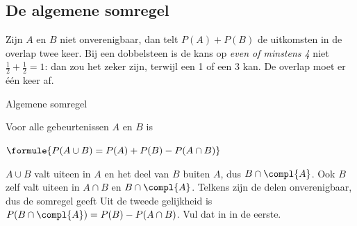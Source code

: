 \begin{oefeningen}
\end{oefeningen}

\subsection{De algemene somregel}

Zijn $A$ en $B$ niet onverenigbaar, dan telt $P(A) + P(B)$ de uitkomsten in de overlap twee keer. Bij een dobbelsteen is de kans op \textit{even of minstens 4} niet $\frac12 + \frac12 = 1$: dan zou het zeker zijn, terwijl een 1 of een 3 kan. De overlap moet er één keer af.

\begin{theorie}
\begin{stelling}{Algemene somregel}
\begin{minipage}[t]{.64\linewidth}
\vspace{0pt}
Voor alle gebeurtenissen $A$ en $B$ is

\vspace{1mm}
\qquad $\formule{P(A \cup B) = P(A) + P(B) - P(A \cap B)}$
\end{minipage}\hfill
\begin{minipage}[t]{.3\linewidth}
\vspace{0pt}
\end{minipage}
\end{stelling}

\begin{bewijs}
$A \cup B$ valt uiteen in $A$ en het deel van $B$ buiten $A$, dus $B \cap \compl{A}$. Ook $B$ zelf valt uiteen in $A \cap B$ en $B \cap \compl{A}$. Telkens zijn de delen onverenigbaar, dus de somregel geeft
Uit de tweede gelijkheid is $P(B \cap \compl{A}) = P(B) - P(A \cap B)$. Vul dat in in de eerste.
\end{bewijs}
\end{theorie}

